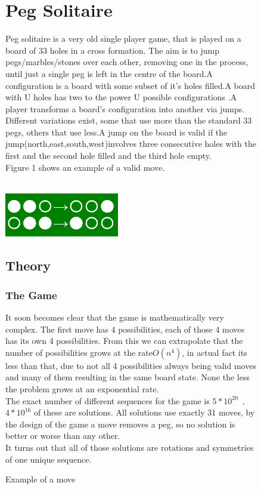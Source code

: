 \documentclass[11pt]{article}
\begin{document}
\begin{figure}
\section{Peg Solitaire}
Peg solitaire is a very old single player game, that is played on a board of 33 holes in a cross formation. The aim is to jump pegs/marbles/stones over each other, removing one in the process, until just a single peg is left in the centre of the board.A configuration is a board with some subset of it's holes filled.A board with U holes has two to the power U possible configurations .A player transforms a board's configuration into another via jumps.  Different variations exist, some that use more than the standard 33 pegs, others that use less.A jump on the board is valid if the jump(north,east,south,west)involves three consecutive holes with the first and the second hole filled and the third hole empty.\\
Figure 1 shows an example of a valid move.\\\\
\begin{center}
\includegraphics[width=5cm]{1}
\end{center}
\caption{Example of a move} 
\label{fig: 1}
\subsection{Theory}
\subsubsection*{The Game}
It soon becomes clear that the game is mathematically very complex. The first move has 4 possibilities, each of those 4 moves has its own 4 possibilities. From this we can extrapolate that the number of possibilities grows at the rate$O(n^4)$, in actual fact its less than that, due to not all 4 possibilities always being valid moves and many of them resulting in the same board state. None the less the problem grows at an exponential rate.\\
The exact number of different sequences for the game is $5*10^{20}$~\cite{durango},  $4*10^{16}$ of these are solutions. 
All solutions use exactly 31 moves, by the design of the game a move removes a peg, so no solution is better or worse than any other.\\
It turns out that all of those solutions are rotations and symmetries of one unique sequence. 


\end{figure}
\end{document}
